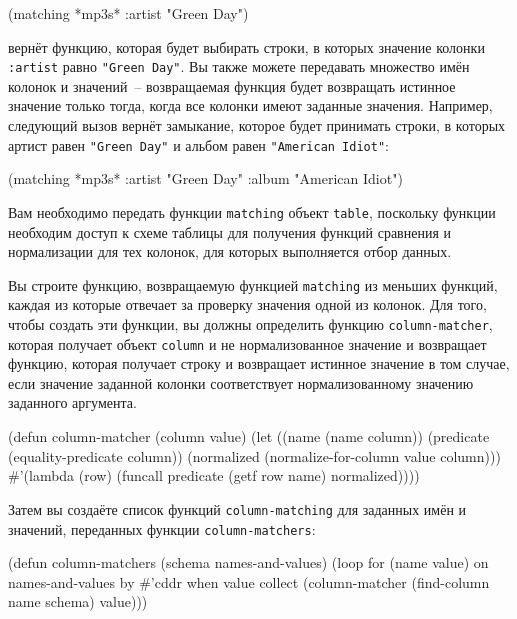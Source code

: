 \begin{myverb}
(matching *mp3s* :artist "Green Day")
\end{myverb}

вернёт функцию, которая будет выбирать строки, в которых значение колонки \lstinline{:artist}
равно \lstinline{"Green Day"}.  Вы также можете передавать множество имён колонок и
значений~-- возвращаемая функция будет возвращать истинное значение только тогда, когда
все колонки имеют заданные значения.  Например, следующий вызов вернёт замыкание, которое
будет принимать строки, в которых артист равен \lstinline{"Green Day"} и альбом равен
\lstinline{"American Idiot"}:

\begin{myverb}
(matching *mp3s* :artist "Green Day" :album "American Idiot")
\end{myverb}

Вам необходимо передать функции \lstinline{matching} объект \lstinline{table}, поскольку функции
необходим доступ к схеме таблицы для получения функций сравнения и нормализации для тех
колонок, для которых выполняется отбор данных.

Вы строите функцию, возвращаемую функцией \lstinline{matching} из меньших функций, каждая из
которые отвечает за проверку значения одной из колонок.  Для того, чтобы создать эти
функции, вы должны определить функцию \lstinline{column-matcher}, которая получает объект
\lstinline{column} и не нормализованное значение и возвращает функцию, которая получает строку
и возвращает истинное значение в том случае, если значение заданной колонки соответствует
нормализованному значению заданного аргумента.

\begin{myverb}
(defun column-matcher (column value)
  (let ((name (name column))
        (predicate (equality-predicate column))
        (normalized (normalize-for-column value column)))
    #'(lambda (row) (funcall predicate (getf row name) normalized))))
\end{myverb}

Затем вы создаёте список функций \lstinline{column-matching} для заданных имён и значений,
переданных функции \lstinline{column-matchers}:

\begin{myverb}
(defun column-matchers (schema names-and-values)
  (loop for (name value) on names-and-values by #'cddr
     when value collect
       (column-matcher (find-column name schema) value)))
\end{myverb}

